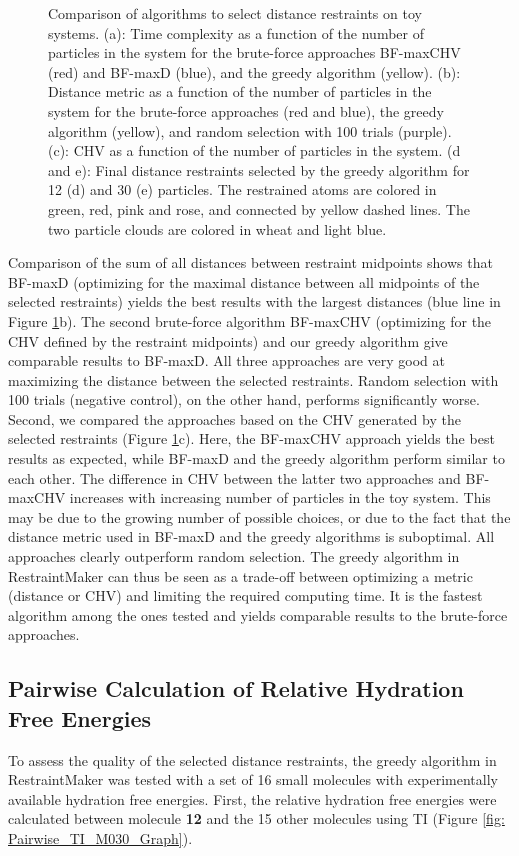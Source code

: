 \begin{figure}[h!]
\begin{subfigure}{0.45\columnwidth}
    \end{subfigure}
    \caption{Comparison of algorithms to select distance restraints on toy systems. (a): Time complexity as a function of the number of particles in the system for the brute-force approaches BF-maxCHV (red) and BF-maxD (blue), and the greedy algorithm (yellow). (b): Distance metric as a function of the number of particles in the system for the brute-force approaches (red and blue), the greedy algorithm (yellow), and random selection with 100 trials (purple). (c): CHV as a function of the number of particles in the system. (d and e): Final distance restraints selected by the greedy algorithm for 12 (d) and 30 (e) particles. The restrained atoms are colored in green, red, pink and rose, and connected by yellow dashed lines. The two particle clouds are colored in wheat and light blue.}
    \label{fig: ToyModels}
\end{figure}

Comparison of the sum of all distances between restraint midpoints shows that BF-maxD (optimizing for the maximal distance between all midpoints of the selected restraints) yields the best results with the largest distances (blue line in Figure \ref{fig: ToyModels}b). The second brute-force algorithm BF-maxCHV (optimizing for the CHV defined by the restraint midpoints) and our greedy algorithm give comparable results to BF-maxD. All three approaches are very good at maximizing the distance between the selected restraints. Random selection with 100 trials (negative control), on the other hand, performs significantly worse.
Second, we compared the approaches based on the CHV generated by the selected restraints (Figure \ref{fig: ToyModels}c). Here, the BF-maxCHV approach yields the best results as expected, while BF-maxD and the greedy algorithm perform similar to each other. The difference in CHV between the latter two approaches and BF-maxCHV increases with increasing number of particles in the toy system. This may be due to the growing number of possible choices, or due to the fact that the distance metric used in BF-maxD and the greedy algorithms is suboptimal. All approaches clearly outperform random selection.
%
The greedy algorithm in RestraintMaker can thus be seen as a trade-off between optimizing a metric (distance or CHV) and limiting the required computing time. It is the fastest algorithm among the ones tested and yields comparable results to the brute-force approaches. 

\subsection{Pairwise Calculation of Relative Hydration Free Energies}
To assess the quality of the selected distance restraints, the greedy algorithm in RestraintMaker was tested with a set of 16 small molecules with experimentally available hydration free energies. First, the relative hydration free energies were calculated between molecule \textbf{12} and the 15 other molecules using TI (Figure \ref{fig: Pairwise_TI_M030_Graph}). 

